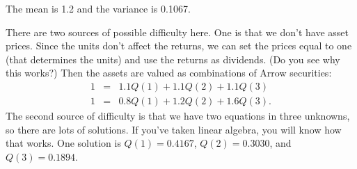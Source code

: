 \documentclass[11pt]{exam}
\begin{document}
\begin{questions}

\begin{solution}
\begin{parts}
\item The mean is 1.2 and the variance is 0.1067.

\item There are two sources of possible difficulty here.
One is that we don't have asset prices.
Since the units don't affect the returns,
we can set the prices equal to one (that determines the units)
and use the returns as dividends.
(Do you see why this works?)
Then the assets are valued as combinations of Arrow securities:
\begin{eqnarray*}
    1  &=&  1.1 Q(1) + 1.1 Q(2) + 1.1 Q(3) \\
    1  &=&  0.8 Q(1) + 1.2 Q(2) + 1.6 Q(3) .
\end{eqnarray*}
The second source of difficulty is that we have two equations in three unknowns,
so there are lots of solutions.
If you've taken linear algebra, you will know how that works.
One solution is $Q(1) = 0.4167$, $Q(2) = 0.3030$, and $Q(3) = 0.1894$.


\end{parts}
\end{solution}
\end{questions}
\end{document}
